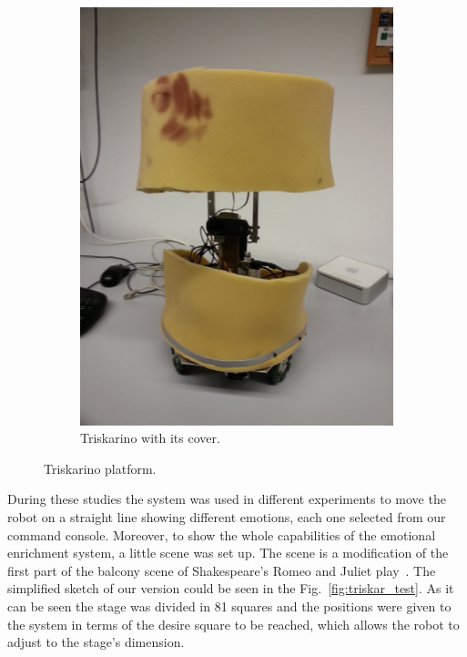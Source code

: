 \begin{figure}
\begin{subfigure}[c]{0.2\textwidth}
	\includegraphics[width=\textwidth]{./Images/platform_fome.jpg}
	\caption{Triskarino with its cover.}
	\label{fig:triskar}
	\end{subfigure}
	\caption{Triskarino platform.}
	\label{fig:robot}
\end{figure}  
 During these studies the system was used in different experiments to move the robot on a straight line showing different emotions, each one selected from our command console. Moreover, to show the whole capabilities of the emotional enrichment system, a little scene was set up. The scene is a modification of the first part of the balcony scene of Shakespeare's Romeo and Juliet play~\cite{RAndJ}. The simplified sketch of our version could be seen in the Fig.~\ref{fig:triskar_test}. As it can be seen the stage was divided in 81 squares and the positions were given to the system in terms of the desire square to be reached, which allows the robot to adjust to the stage's dimension. %
